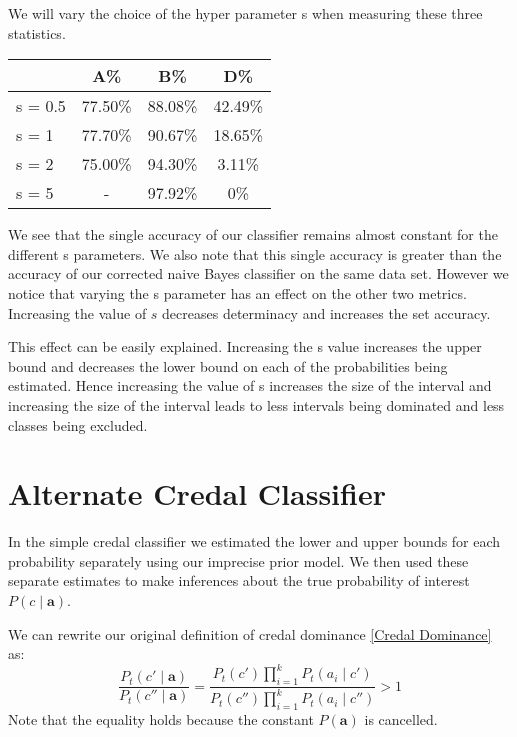 We will vary the choice of the hyper parameter s when measuring these three statistics.
\begin{center}
\begin{tabular}{l|c c c}
        & A\%     & B\%     & D\%     \\
\hline
s = 0.5 & 77.50\% & 88.08\% & 42.49\% \\
s = 1   & 77.70\% & 90.67\% & 18.65\% \\
s = 2   & 75.00\% & 94.30\% & 3.11\% \\
s = 5   & -       & 97.92\% & 0\%   \\
\end{tabular}
\end{center}

We see that the single accuracy of our classifier remains almost constant for the different s parameters.
We also note that this single accuracy is greater than the accuracy of our corrected naive Bayes classifier on the same data set.
However we notice that varying the s parameter has an effect on the other two metrics.
Increasing the value of $s$ decreases determinacy and increases the set accuracy.

This effect can be easily explained.
Increasing the s value increases the upper bound and decreases the lower bound on each of the probabilities being estimated.
Hence increasing the value of s increases the size of the interval and increasing the size of the interval leads to less intervals being dominated and less classes being excluded.

\section{Alternate Credal Classifier}
In the simple credal classifier we estimated the lower and upper bounds for each probability separately using our imprecise prior model.
We then used these separate estimates to make inferences about the true probability of interest $P(c \mid \mathbf{a})$.

We can rewrite our original definition of credal dominance \cref{Credal Dominance} as:
\begin{equation}
	\frac{P_t(c' \mid \mathbf{a})}{P_t(c'' \mid \mathbf{a})} = \frac{P_t(c')\prod_{i=1}^{k}P_t(a_i \mid c')}{P_t(c'')\prod_{i=1}^{k}P_t(a_i \mid c'')} > 1
\end{equation}
Note that the equality holds because the constant $P(\mathbf{a})$ is cancelled.

